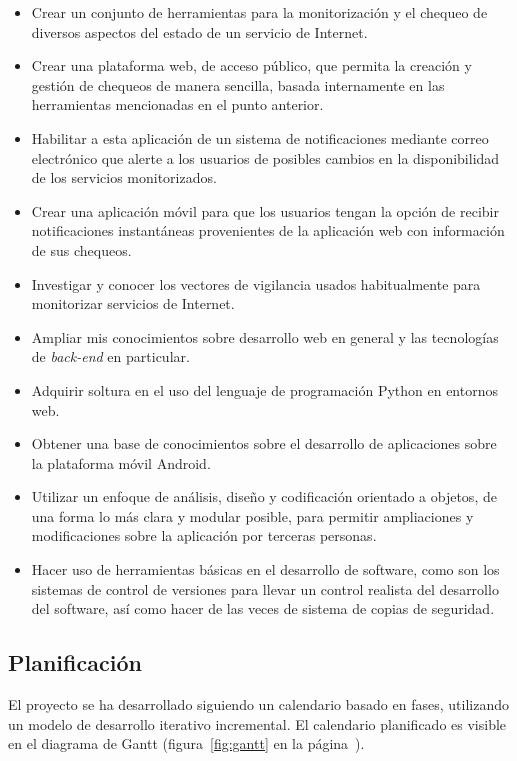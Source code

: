 \documentclass[a4paper,12pt]{article}
\begin{document}
\begin{itemize}

\item Crear un conjunto de herramientas para la monitorización y el chequeo de
  diversos aspectos del estado de un servicio de Internet.
\item Crear una plataforma web, de acceso público, que permita la creación y
  gestión de chequeos de manera sencilla, basada internamente en las
  herramientas mencionadas en el punto anterior.
\item Habilitar a esta aplicación de un sistema de notificaciones mediante correo
  electrónico que alerte a los usuarios de posibles cambios en la disponibilidad
  de los servicios monitorizados.
\item Crear una aplicación móvil para que los usuarios tengan la opción de
  recibir notificaciones instantáneas provenientes de la aplicación web con
  información de sus chequeos.

\item Investigar y conocer los vectores de vigilancia usados habitualmente para
  monitorizar servicios de Internet.
\item Ampliar mis conocimientos sobre desarrollo web en general y las
  tecnologías de \textit{back-end} en particular.
\item Adquirir soltura en el uso del lenguaje de programación Python en entornos
  web.
\item Obtener una base de conocimientos sobre el desarrollo de aplicaciones
  sobre la plataforma móvil Android.
\item Utilizar un enfoque de análisis, diseño y codificación orientado
  a objetos, de una forma lo más clara y modular posible, para
  permitir ampliaciones y modificaciones sobre la aplicación por
  terceras personas.
\item Hacer uso de herramientas básicas en el desarrollo de software,
  como son los sistemas de control de versiones para llevar
  un control realista del desarrollo del software, así como hacer de
  las veces de sistema de copias de seguridad.

\end{itemize}

\subsection{Planificación}
El proyecto se ha desarrollado siguiendo un calendario basado en fases,
utilizando un modelo de desarrollo iterativo incremental. El calendario
planificado es visible en el diagrama de Gantt (figura~\ref{fig:gantt} en la
página~\pageref{fig:gantt}).
\end{document}
